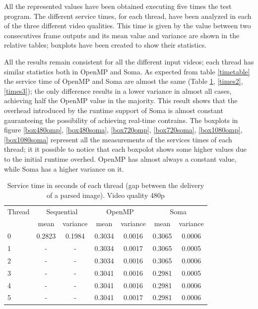 \documentclass[a4paper,12pt,oneside]{book}
\begin{document}
All the represented values have been obtained executing five times the test program. The different service times, for each thread, have been analyzed in each of the three different video qualities. This time is given by the value between two consecutives frame outputs and its mean value and variance are shown in the relative tables; boxplots have been created to show their statistics. 

All the results remain consistent for all the different input videos; each thread has similar statistics both in OpenMP and Soma. As expected from table \ref{timetable} the service time of OpenMP and Soma are almost the same (Table \ref{times}, \ref{times2}, \ref{times3}); the only difference results in a lower variance in almost all cases, achieving half the OpenMP value in the majority. This result shows that the overhead introduced by the runtime support of Soma is almost constant gauranteeing the possibility of achieving real-time contrains. The boxplots in figure \ref{box480omp}, \ref{box480soma}, \ref{box720omp}, \ref{box720soma}, \ref{box1080omp}, \ref{box1080soma} represent all the measurements of the services times of each thread; it it possible to notice that each boxpolot shows some higher values due to the initial runtime overhed. OpenMP has almost always a constant value, while Soma has a higher variance on it.


\begin{table}[H]
\begin{center}
\begin{tabular}{| l || c | c || c | c || c | c |} 
\hline
  Thread & \multicolumn{2}{|c||}{Sequential} & \multicolumn{2}{|c||}{OpenMP} & \multicolumn{2}{|c|}{Soma} \\
\cline{2-7}
& mean & variance & mean & variance & mean & variance \\
\cline{2-7}
\hline
0 & 0.2823 & 0.1984 & 0.3034 & 0.0016 & 0.3065 & 0.0006  \\
\hline
1 & - & - & 0.3034 & 0.0017 & 0.3065 & 0.0005 \\
\hline
2 & - & - & 0.3034 & 0.0016 & 0.3065 & 0.0006 \\
\hline 
3 & - & - & 0.3041 & 0.0016 & 0.2981 & 0.0005 \\
\hline
4 & - & - & 0.3041 & 0.0016 & 0.2981 & 0.0006 \\
\hline
5 & - & - & 0.3041 & 0.0017 & 0.2981 &  0.0006       \\
\hline
\end{tabular}
\caption{Service time in seconds of each thread (gap between the delivery of a parsed image). Video quality 480p}
\label{times}
\end{center}
\end{table}
\end{document}
